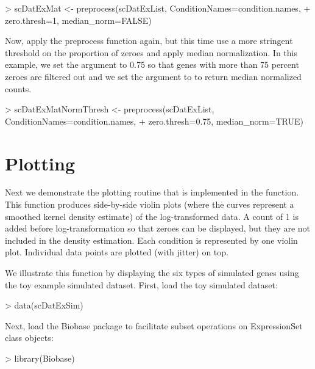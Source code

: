 \documentclass{article}
\begin{document}
\begin{Schunk}
\begin{Sinput}
> scDatExMat <- preprocess(scDatExList, ConditionNames=condition.names, 
+                         zero.thresh=1, median_norm=FALSE)
\end{Sinput}
\end{Schunk}

Now, apply the preprocess function again, but this time use a more stringent threshold on the proportion of zeroes and apply median normalization.  In this example, we set the  argument to 0.75 so that genes with more than 75 percent zeroes are filtered out and we set the  argument to  to return median normalized counts.

\begin{Schunk}
\begin{Sinput}
> scDatExMatNormThresh <- preprocess(scDatExList, ConditionNames=condition.names, 
+                                    zero.thresh=0.75, median_norm=TRUE)
\end{Sinput}
\end{Schunk}

\section{Plotting}

Next we demonstrate the plotting routine that is implemented in the  function.  This function produces side-by-side violin plots (where the curves represent a smoothed kernel density estimate)
of the log-transformed data.  A count of 1 is added before log-transformation so that zeroes can be displayed, but they are not included in the density estimation.  Each condition is represented by one violin plot.  Individual data points are plotted (with jitter) on top. 

We illustrate this function by displaying the six types of simulated genes using the toy example simulated dataset.  First, load the toy simulated dataset:

\begin{Schunk}
\begin{Sinput}
> data(scDatExSim)
\end{Sinput}
\end{Schunk}

Next, load the Biobase package to facilitate subset operations on ExpressionSet class objects:
\begin{Schunk}
\begin{Sinput}
> library(Biobase)
\end{Sinput}
\end{Schunk}
\end{document}
